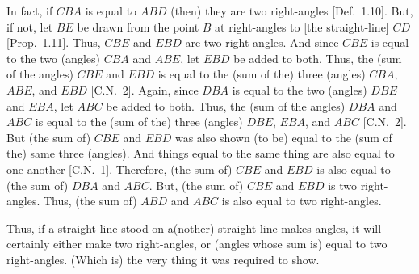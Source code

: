 \begin{Parallel}{}{}
{In fact, if $CBA$ is equal to $ABD$ (then) they are two right-angles [Def.~1.10].
But, if not, let $BE$ be drawn from the point $B$ at right-angles to [the
straight-line] $CD$ [Prop.~1.11]. Thus, $CBE$ and $EBD$ are two right-angles.
And since $CBE$ is equal to the two (angles) $CBA$ and $ABE$, let $EBD$ be added
to both. Thus, the (sum of the angles) $CBE$ and $EBD$ is equal to the  (sum of the) three (angles)
$CBA$, $ABE$, and $EBD$ [C.N.~2]. Again, since $DBA$ is equal to the two (angles) $DBE$
and $EBA$, let $ABC$ be added to both. Thus, the (sum of the angles) $DBA$ and $ABC$ is
equal to the (sum of the) three (angles) $DBE$, $EBA$, and $ABC$ [C.N.~2]. But (the sum of) $CBE$ and $EBD$ was
also shown (to be) equal to the (sum of the) same three (angles). And things equal to the
same thing are also equal to one another [C.N.~1]. Therefore, 
(the sum of) $CBE$ and
$EBD$ is also equal to (the sum of) $DBA$ and $ABC$. But, (the sum of) $CBE$ and $EBD$ is two
right-angles. Thus, (the sum of) $ABD$ and $ABC$ is also equal to two right-angles.

Thus, if a straight-line stood on a(nother)  straight-line makes angles,
it will certainly either make two right-angles, or (angles whose sum is) equal
to two right-angles. (Which is) the very thing it was required to show.}
\end{Parallel}

